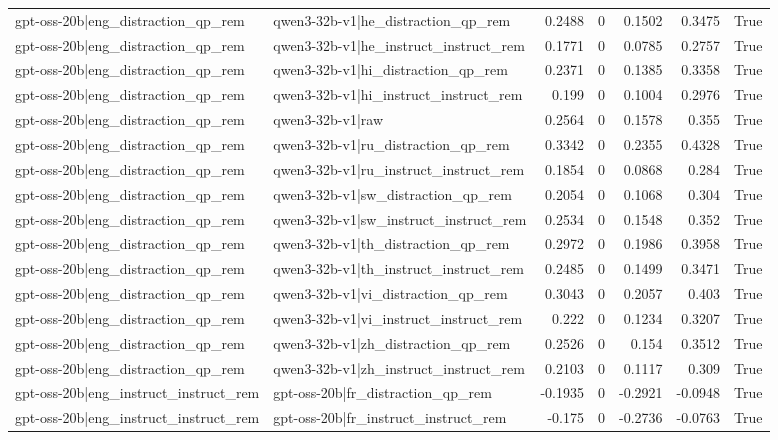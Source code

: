 \begin{table}
\begin{tabular}{l l r r r r l}
gpt-oss-20b|eng_distraction_qp_rem & qwen3-32b-v1|he_distraction_qp_rem & 0.2488 & 0 & 0.1502 & 0.3475 & True \\
gpt-oss-20b|eng_distraction_qp_rem & qwen3-32b-v1|he_instruct_instruct_rem & 0.1771 & 0 & 0.0785 & 0.2757 & True \\
gpt-oss-20b|eng_distraction_qp_rem & qwen3-32b-v1|hi_distraction_qp_rem & 0.2371 & 0 & 0.1385 & 0.3358 & True \\
gpt-oss-20b|eng_distraction_qp_rem & qwen3-32b-v1|hi_instruct_instruct_rem & 0.199 & 0 & 0.1004 & 0.2976 & True \\
gpt-oss-20b|eng_distraction_qp_rem & qwen3-32b-v1|raw & 0.2564 & 0 & 0.1578 & 0.355 & True \\
gpt-oss-20b|eng_distraction_qp_rem & qwen3-32b-v1|ru_distraction_qp_rem & 0.3342 & 0 & 0.2355 & 0.4328 & True \\
gpt-oss-20b|eng_distraction_qp_rem & qwen3-32b-v1|ru_instruct_instruct_rem & 0.1854 & 0 & 0.0868 & 0.284 & True \\
gpt-oss-20b|eng_distraction_qp_rem & qwen3-32b-v1|sw_distraction_qp_rem & 0.2054 & 0 & 0.1068 & 0.304 & True \\
gpt-oss-20b|eng_distraction_qp_rem & qwen3-32b-v1|sw_instruct_instruct_rem & 0.2534 & 0 & 0.1548 & 0.352 & True \\
gpt-oss-20b|eng_distraction_qp_rem & qwen3-32b-v1|th_distraction_qp_rem & 0.2972 & 0 & 0.1986 & 0.3958 & True \\
gpt-oss-20b|eng_distraction_qp_rem & qwen3-32b-v1|th_instruct_instruct_rem & 0.2485 & 0 & 0.1499 & 0.3471 & True \\
gpt-oss-20b|eng_distraction_qp_rem & qwen3-32b-v1|vi_distraction_qp_rem & 0.3043 & 0 & 0.2057 & 0.403 & True \\
gpt-oss-20b|eng_distraction_qp_rem & qwen3-32b-v1|vi_instruct_instruct_rem & 0.222 & 0 & 0.1234 & 0.3207 & True \\
gpt-oss-20b|eng_distraction_qp_rem & qwen3-32b-v1|zh_distraction_qp_rem & 0.2526 & 0 & 0.154 & 0.3512 & True \\
gpt-oss-20b|eng_distraction_qp_rem & qwen3-32b-v1|zh_instruct_instruct_rem & 0.2103 & 0 & 0.1117 & 0.309 & True \\
gpt-oss-20b|eng_instruct_instruct_rem & gpt-oss-20b|fr_distraction_qp_rem & -0.1935 & 0 & -0.2921 & -0.0948 & True \\
gpt-oss-20b|eng_instruct_instruct_rem & gpt-oss-20b|fr_instruct_instruct_rem & -0.175 & 0 & -0.2736 & -0.0763 & True \\

\end{tabular}
\end{table}
